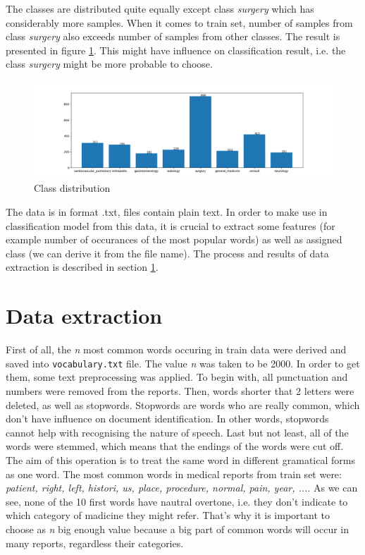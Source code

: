 \documentclass{article}
\begin{document}
The classes are distributed quite equally except class \textit{surgery} which has considerably more samples. When it comes to train set, number of samples from class \textit{surgery} also exceeds number of samples from other classes. The result is presented in figure \ref{fig:class_train_distr}. This might have influence on classification result, i.e. the class \textit{surgery} might be more probable to choose.

\begin{figure}[!ht]
    \centering
    \includegraphics[width=\textwidth]{images/classes_train_distr.png}
    \caption{Class distribution}
    \label{fig:class_train_distr}
\end{figure}

The data is in format .txt, files contain plain text. In order to make use in classification model from this data, it is crucial to extract some features (for example number of occurances of the most popular words) as well as assigned class (we can derive it from the file name). The process and results of data extraction is described in section \ref{section:data_extraction}.


\section{Data extraction}
\label{section:data_extraction}
First of all, the \textit{n} most common words occuring in train data were derived and saved into \texttt{vocabulary.txt} file. The value \textit{n} was taken to be 2000. In order to get them, some text preprocessing was applied. To begin with, all punctuation and numbers were removed from the reports. Then, words shorter that 2 letters were deleted, as well as stopwords. Stopwords are words who are really common, which don't have influence on document identification. In other words, stopwords cannot help with recognising the nature of speech. Last but not least, all of the words were stemmed, which means that the endings of the words were cut off. The aim of this operation is to treat the same word in different gramatical forms as one word. The most common words in medical reports from train set were: \textit{patient, right, left, histori, us, place, procedure, normal, pain, year, ...}. As we can see, none of the 10 first words have nautral overtone, i.e. they don't indicate to which category of madicine they might refer. That's why it is important to choose as \textit{n} big enough value because a big part of common words will occur in many reports, regardless their categories.
\end{document}
